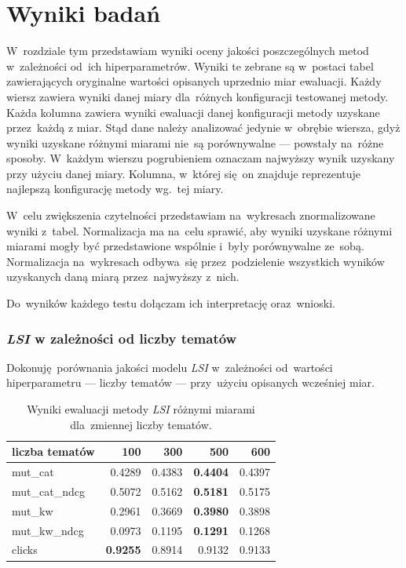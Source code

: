 \documentclass[pl]{minipw} %
\begin{document}
\chapter{Wyniki badań}
W~rozdziale tym przedstawiam wyniki oceny jakości poszczególnych metod w~zależności od~ich hiperparametrów. Wyniki te zebrane są w~postaci tabel zawierających oryginalne wartości opisanych uprzednio miar ewaluacji. Każdy wiersz zawiera wyniki danej miary dla~różnych konfiguracji testowanej metody. Każda kolumna zawiera wyniki ewaluacji danej konfiguracji metody uzyskane przez~każdą z miar. Stąd dane należy analizować jedynie w~obrębie wiersza, gdyż wyniki uzyskane różnymi miarami nie~są porównywalne --- powstały na~różne sposoby. W~każdym wierszu pogrubieniem oznaczam najwyższy wynik uzyskany przy użyciu danej miary. Kolumna, w~której się on znajduje reprezentuje najlepszą konfigurację metody wg.~tej miary.

W~celu zwiększenia czytelności przedstawiam na~wykresach znormalizowane wyniki z~tabel. Normalizacja ma na~celu sprawić, aby wyniki uzyskane różnymi miarami mogły być przedstawione wspólnie i~były porównywalne ze~sobą. Normalizacja na~wykresach odbywa~się przez~podzielenie wszystkich wyników uzyskanych daną miarą przez~najwyższy z~nich.

Do~wyników każdego testu dołączam ich interpretację oraz~wnioski.

\subsection{\textit{LSI} w zależności od liczby tematów}

Dokonuję porównania jakości modelu \textit{LSI} w~zależności od~wartości hiperparametru --- liczby tematów --- przy~użyciu opisanych wcześniej miar.

\begin{table}[H]
	\centering
	\begin{tabular}{lrrrr}
		\hline
		liczba tematów &       100 &      300 &      500 &      600 \\
		\hline
		mut\_cat      & 0.4289 & 0.4383 & \textbf{0.4404} & 0.4397 \\
		mut\_cat\_ndcg & 0.5072 & 0.5162 & \textbf{0.5181} & 0.5175 \\
		mut\_kw       & 0.2961 & 0.3669 & \textbf{0.3980}  & 0.3898 \\
		mut\_kw\_ndcg  & 0.0973 & 0.1195 &\textbf{ 0.1291} & 0.1268 \\
		clicks       & \textbf{0.9255} & 0.8914 & 0.9132 & 0.9133 \\
		\hline
	\end{tabular}
	\caption{Wyniki ewaluacji metody \textit{LSI} różnymi miarami dla~zmiennej liczby tematów.}
\end{table}
\end{document}
